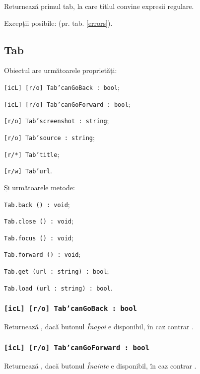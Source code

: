 Returnează primul tab, la care titlul convine expresii regulare.

Excepții posibile:  (pr. tab. \ref{errors}).

\subsection{{\color{orange} Tab}}

Obiectul \tab{} are următoarele proprietăți:
\begin{icItems}
	\item \texttt{[icL] [r/o] Tab'canGoBack : bool};
	\item \texttt{[icL] [r/o] Tab'canGoForward : bool};
	\item \texttt{[r/o] Tab'screenshot : string};
	\item \texttt{[r/o] Tab'source : string};
	\item \texttt{[r/*] Tab'title};
	\item \texttt{[r/w] Tab'url}.
\end{icItems}

Și următoarele metode:
\begin{icItems}
	\item \texttt{Tab.back () : void};
	\item \texttt{Tab.close () : void};
	\item \texttt{Tab.focus () : void};
	\item \texttt{Tab.forward () : void};
	\item \texttt{Tab.get (url : string) : bool};
	\item \texttt{Tab.load (url : string) : bool}.
\end{icItems}

\subsubsection{\texttt{[icL] [r/o] Tab'canGoBack : bool}}

Returnează \true, dacă butonul \textit{Înapoi} e disponibil, în caz contrar \false.

\subsubsection{\texttt{[icL] [r/o] Tab'canGoForward : bool}}

Returnează \true, dacă butonul \textit{Înainte} e disponibil, în caz contrar \false.

